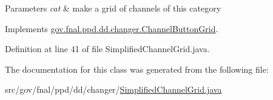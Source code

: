\begin{DoxyParams}{Parameters}
{\em cat} & make a grid of channels of this category \\
\hline
\end{DoxyParams}


Implements \hyperlink{classgov_1_1fnal_1_1ppd_1_1dd_1_1changer_1_1ChannelButtonGrid_a5acf39593b87514d5015b219e91ddeac}{gov.\-fnal.\-ppd.\-dd.\-changer.\-Channel\-Button\-Grid}.



Definition at line 41 of file Simplified\-Channel\-Grid.\-java.



The documentation for this class was generated from the following file\-:\begin{DoxyCompactItemize}
\item 
src/gov/fnal/ppd/dd/changer/\hyperlink{SimplifiedChannelGrid_8java}{Simplified\-Channel\-Grid.\-java}\end{DoxyCompactItemize}
